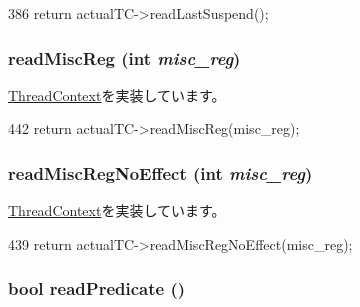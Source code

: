 \begin{DoxyCode}
386 { return actualTC->readLastSuspend(); }
\end{DoxyCode}
\hypertarget{classProxyThreadContext_a5a8c6c487e8da143d26188258b04f1cc}{
\subsubsection[{readMiscReg}]{ readMiscReg (int {\em misc\_\-reg})}}
\label{classProxyThreadContext_a5a8c6c487e8da143d26188258b04f1cc}


\hyperlink{classThreadContext_a6888f4bff21e34892e59654ea80073b2}{ThreadContext}を実装しています。


\begin{DoxyCode}
442     { return actualTC->readMiscReg(misc_reg); }
\end{DoxyCode}
\hypertarget{classProxyThreadContext_a7b5ac6af9c2c19d7c1b442b8a3aebbc6}{
\subsubsection[{readMiscRegNoEffect}]{ readMiscRegNoEffect (int {\em misc\_\-reg})}}
\label{classProxyThreadContext_a7b5ac6af9c2c19d7c1b442b8a3aebbc6}


\hyperlink{classThreadContext_a93c9c97261cb7289d5976b8222f70c4c}{ThreadContext}を実装しています。


\begin{DoxyCode}
439     { return actualTC->readMiscRegNoEffect(misc_reg); }
\end{DoxyCode}
\hypertarget{classProxyThreadContext_a254cecc48d457ea298b08a8bb009f9cf}{
\subsubsection[{readPredicate}]{\setlength{\rightskip}{0pt plus 5cm}bool readPredicate ()}}
\label{classProxyThreadContext_a254cecc48d457ea298b08a8bb009f9cf}



